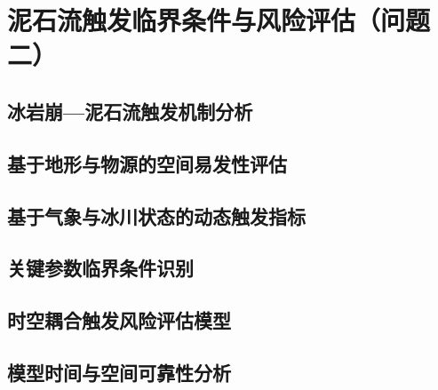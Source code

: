 \section{泥石流触发临界条件与风险评估（问题二）}\label{sec:thresholds}

\subsection{冰岩崩—泥石流触发机制分析}\label{sec:trigger-mechanisms}
\writingplaceholder

\subsection{基于地形与物源的空间易发性评估}\label{sec:susceptibility}
\writingplaceholder

\subsection{基于气象与冰川状态的动态触发指标}\label{sec:dynamic-indicators}
\writingplaceholder

\subsection{关键参数临界条件识别}\label{sec:critical-conditions}
\writingplaceholder

\subsection{时空耦合触发风险评估模型}\label{sec:coupled-risk}
\writingplaceholder

\subsection{模型时间与空间可靠性分析}\label{sec:risk-reliability}
\writingplaceholder
